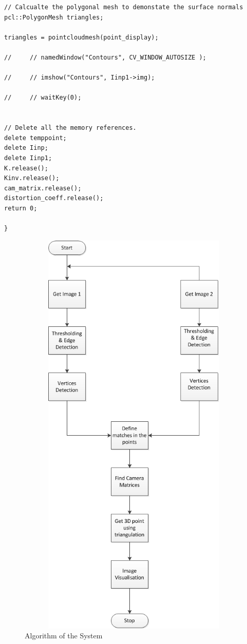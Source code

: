 \pagebreak
\begin{lstlisting}	
// Calcualte the polygonal mesh to demonstate the surface normals 
pcl::PolygonMesh triangles;

triangles = pointcloudmesh(point_display);

//     // namedWindow("Contours", CV_WINDOW_AUTOSIZE );
    
//     // imshow("Contours", Iinp1->img);
  
//     // waitKey(0);


// Delete all the memory references.
delete temppoint; 
delete Iinp; 
delete Iinp1;
K.release();
Kinv.release();
cam_matrix.release();
distortion_coeff.release();
return 0; 

}

\end{lstlisting}

\begin{figure} [ht] 
    \centering
    \includegraphics[width=20cm,height=20cm,keepaspectratio]{Pictures/full}
    \caption{Algorithm of the System}
    \label{fig:algo}
\end{figure}


